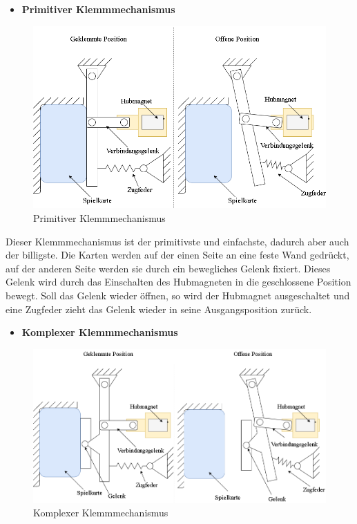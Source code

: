\begin{itemize}
    \item \textbf{Primitiver Klemmmechanismus}
\end{itemize}

\begin{figure}[H]
    \centering
    \includegraphics[scale=0.5,page=1]{fig/mech/Klemmmechanissmus-Page-1.png}
    \caption{Primitiver Klemmmechanismus}
\end{figure}

Dieser Klemmmechanismus ist der primitivste und einfachste, dadurch aber auch der billigste.
Die Karten werden auf der einen Seite an eine feste Wand gedrückt, auf der anderen Seite werden sie durch ein bewegliches Gelenk fixiert.
Dieses Gelenk wird durch das Einschalten des Hubmagneten in die geschlossene Position bewegt.
Soll das Gelenk wieder öffnen, so wird der Hubmagnet ausgeschaltet und eine Zugfeder zieht das Gelenk wieder in seine Ausgangsposition zurück.

\begin{itemize}
    \item \textbf{Komplexer Klemmmechanismus}
\end{itemize}

\begin{figure}[H]
    \centering
    \includegraphics[scale=0.5,page=1]{fig/mech/Klemmmechanissmus-Page-2.png}
    \caption{Komplexer Klemmmechanismus}
\end{figure}

